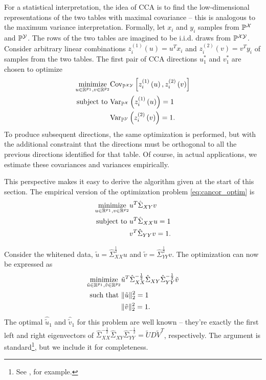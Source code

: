\documentclass{article}
\begin{document}
For a statistical interpretation, the idea of CCA is to find the low-dimensional
representations of the two tables with maximal covariance -- this is analogous
to the maximum variance interpretation. Formally, let $x_{i}$ and $y_{i}$
samples from $\mathbb{P}^{\mathcal{X}}$ and $\mathbb{P}^{\mathcal{Y}}$. The rows of the two tables are imagined to
be i.i.d. draws from $\mathbb{P}^{\mathcal{X}\mathcal{Y}}$. Consider arbitrary linear combinations
$z_{i}^{(1)}\left(u\right) = u^{T} x_{i}$ and $z_{i}^{(2)}\left(v\right) =
v^{T}y_{i}$ of samples from the two tables. The first pair of CCA directions
$u_{1}^{\ast}$ and $v_{1}^{\ast}$ are chosen to optimize
\begin{align}
  \mathop\mathrm{minimize}_{u \in \mathbb{R}^{p_{1}}, v \in \mathbb{R}^{p_{2}}}
  &\mathrm{Cov}_{\mathbb{P}^{\mathcal{X}\mathcal{Y}}}\left[{z_{i}^{(1)}\left(u\right),
    z_{i}^{(2)}\left(v\right)}\right] \label{eq:cancor_optim} \\
\text{subject to } &\mathrm{Var}_{\mathbb{P}^{\mathcal{X}}}\left(z_{i}^{(1)}\left(u\right)\right) = 1 \nonumber \\
&\mathrm{Var}_{\mathbb{P}^{\mathcal{Y}}}\left(z_{i}^{(2)}\left(v\right)\right) = 1. \nonumber
\end{align}
To produce subsequent directions, the same optimization is performed, but with
the additional constraint that the directions must be orthogonal to all the
previous directions identified for that table. Of course, in actual
applications, we estimate these covariances and variances empirically.

This perspective makes it easy to derive the algorithm given at the start of
this section. The empirical version of the optimization problem
\ref{eq:cancor_optim} is
\begin{align}
  \mathop\mathrm{minimize}_{u \in \mathbb{R}^{p_{1}}, v \in \mathbb{R}^{p_{2}}}
  &u^{T}\hat{\Sigma}_{XY}v \label{eq:cancor_optim_emp}\\
  \text{subject to } & u^{T}\hat{\Sigma}_{XX}u = 1 \nonumber \\
  & v^{T}\hat{\Sigma}_{YY}v = 1. \nonumber
\end{align}

Consider the whitened data, $\tilde{u} = \hat{\Sigma}_{XX}^{\frac{1}{2}}u$ and
$\tilde{v} = \hat{\Sigma}_{YY}^{\frac{1}{2}}v$. The
optimization \label{eq:cancor_emp} can now be expressed as
\begin{align}
  \mathop\mathrm{minimize}_{\tilde{u} \in \mathbb{R}^{p_{1}}, \tilde{v} \in
    \mathbb{R}^{p_{2}}} 
    &\tilde{u}^{T}\hat{\Sigma}_{XX}^{-\frac{1}{2}}\hat{\Sigma}_{XY}\hat{\Sigma}_{YY}^{-\frac{1}{2}}\tilde{v} \label{eq:cancor_trans} \\
    \text{such that } & \|\tilde{u}\|^{2}_{2} = 1 \nonumber \\
    &\|\tilde{v}\|_{2}^{2} = 1. \nonumber
\end{align}
The optimal $\hat{\tilde{u}}_1$ and $\hat{\tilde{v}}_1$ for this problem are
well known -- they're exactly the first left and right eigenvectors of
$\hat{\Sigma}_{XX}^{-\frac{1}{2}}\hat{\Sigma}_{XY}\hat{\Sigma}_{YY}^{-\frac{1}{2}}
= \tilde{U}D\tilde{V}^{T}$, respectively. The argument is standard\footnote{See
  \citep{mardia1980multivariate}, for example.}, but we include it for
completeness.
\end{document}
